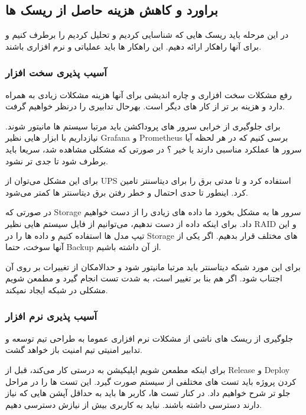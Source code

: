 \subsection{براورد و کاهش هزینه حاصل از ریسک ها}
در این مرحله باید ریسک هایی که شناسایی کردیم و تحلیل کردیم را برطرف کنیم و برای آنها راهکار ارائه دهیم.
این راهکار ها باید عملیاتی و نرم افزاری باشند.

\subsubsection{آسیب پذیری سخت افزار}
رفع مشکلات سخت افزاری و چاره اندیشی برای آنها هزینه مشکلات زیادی به همراه دارد و هزینه بر تر از کار های دیگر است. بهرحال تدابیری را درنظر خواهیم گرفت.

برای جلوگیری از خرابی سرور های پروداکشن باید مرتبا سیستم ها مانیتور شوند. نیازداریم با ابزار هایی نظیر Grafana و Prometheus برسی کنیم که در هر لحظه
آیا سرور ها عملکرد مناسبی دارند یا خیر ؟
در صورتی که مشکلی مشاهده شد، سریعا باید برطرف شود تا جدی تر نشود.


برای این مشکل می‌توان از UPS استفاده کرد و تا مدتی برق را برای دیتاسنتر تامین کرد. اینطور تا حدی احتمال و خطر رفتن برق دیتاسنتر ها کمتر می‌شود.


در صورتی که Storage سرور ها به مشکل بخورد ما داده های زیادی را از دست خواهیم داد. برای اینکه داده از دست ندهیم، می‌توانیم از فایل سیستم هایی نظیر RAID و این تیپ
مدل ها استفاده کنیم و داده ها را در Storage های مختلف قرار بدهیم. اگر یکی از آنها سوخت، حتما Backup از آن داشته باشیم.


برای این مورد شبکه دیتاسنتر باید مرتبا مانیتور شود و حدالامکان از تغییرات بر روی آن اجتناب شود. اگر هم بنا بر تغییر است، به شدت تست انجام گیرد و 
مطمعن شویم مشکلی در شبکه ایجاد نمیکند.

\subsubsection{آسیب پذیری نرم افزار}
جلوگیری از ریسک های ناشی از مشکلات نرم افزاری عموما به طراحی تیم توسعه و تدابیر امنیتی تیم امنیت باز خواهد گشت.


برای اینکه مطمعن شویم اپلیکیشن به درستی کار می‌کند، قبل از Release و Deploy کردن پروژه باید تست های مختلفی از سیستم صورت گیرد.
این تست ها را در مراحل جلو تر شرح خواهیم داد. در کنار تست ها، کاربر ها باید به حداقل آپشن هایی که نیاز دارند دسترسی داشته باشند.
نباید به کاربری بیش از نیازش دسترسی دهیم.

